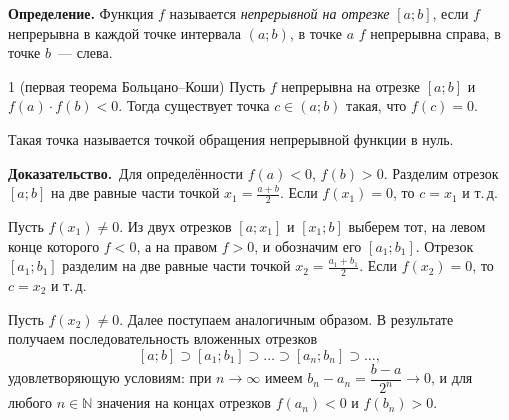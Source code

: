\documentclass[a4paper,11pt]{article}
\newcommand{\dok}{\textbf{Доказательство.}\ }
\begin{document}
\begin{opr}
\textbf{Определение.} Функция $f$ называется \emph{непрерывной на отрезке} $[a; b]$, если $f$
непрерывна в каждой точке интервала $(a; b)$, в точке $a$ $f$ непрерывна справа, в точке $b$~--- слева.
\end{opr}

\begin{teor}{1 (первая теорема Больцано--Коши)}
  Пусть $f$ непрерывна на отрезке $[a; b]$ и $f(a) \cdot f(b) < 0$. Тогда существует точка
  $c \in (a; b)$ такая, что $f(c) = 0$.
\end{teor}

Такая точка называется точкой обращения непрерывной функции в нуль.

\begin{center}
\end{center}

\dok Для определённости $f(a) < 0$, $f(b) > 0$. Разделим отрезок $[a; b]$ на две равные части точкой
$x_1 = \frac{a + b}{2}$. Если $f(x_1) = 0$, то $c = x_1$ и т.\,д.

Пусть $f(x_1) \ne 0$. Из двух отрезков $[a; x_1]$ и $[x_1; b]$ выберем тот, на левом конце которого
$f < 0$, а на правом $f > 0$, и обозначим его $[a_1; b_1]$. Отрезок $[a_1; b_1]$ разделим на две равные
части точкой $x_2 = \frac{a_1 + b_1}{2}$. Если $f(x_2) = 0$, то $c = x_2$ и т.\,д.

Пусть $f(x_2) \ne 0$. Далее поступаем аналогичным образом. В результате получаем последовательность
вложенных отрезков
\[
  [a; b] \supset [a_1; b_1] \supset \dots \supset [a_n; b_n] \supset \dots,
\]
удовлетворяющую условиям: при $n \to \infty$ имеем $b_n - a_n = \dfrac{b - a}{2^n} \to 0$,
и для любого $n \in \mathbb{N}$ значения на концах отрезков $f(a_n) < 0$ и $f(b_n) > 0$.
\end{document}
